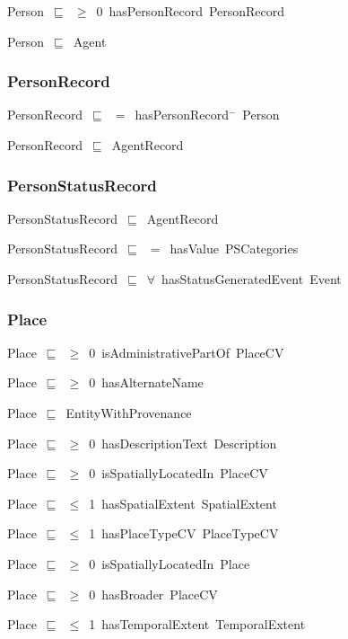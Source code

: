 \documentclass{article}
\begin{document}
Person~\ensuremath{\sqsubseteq}~\ensuremath{\geq}~0~hasPersonRecord~PersonRecord~

Person~\ensuremath{\sqsubseteq}~Agent~

\subsubsection*{PersonRecord}

PersonRecord~\ensuremath{\sqsubseteq}~\ensuremath{=}~hasPersonRecord\ensuremath{^-}~Person~

PersonRecord~\ensuremath{\sqsubseteq}~AgentRecord~

\subsubsection*{PersonStatusRecord}

PersonStatusRecord~\ensuremath{\sqsubseteq}~AgentRecord~

PersonStatusRecord~\ensuremath{\sqsubseteq}~\ensuremath{=}~hasValue~PSCategories~

PersonStatusRecord~\ensuremath{\sqsubseteq}~\ensuremath{\forall}~hasStatusGeneratedEvent~Event~

\subsubsection*{Place}

Place~\ensuremath{\sqsubseteq}~\ensuremath{\geq}~0~isAdministrativePartOf~PlaceCV~

Place~\ensuremath{\sqsubseteq}~\ensuremath{\geq}~0~hasAlternateName~

Place~\ensuremath{\sqsubseteq}~EntityWithProvenance~

Place~\ensuremath{\sqsubseteq}~\ensuremath{\geq}~0~hasDescriptionText~Description~

Place~\ensuremath{\sqsubseteq}~\ensuremath{\geq}~0~isSpatiallyLocatedIn~PlaceCV~

Place~\ensuremath{\sqsubseteq}~\ensuremath{\leq}~1~hasSpatialExtent~SpatialExtent~

Place~\ensuremath{\sqsubseteq}~\ensuremath{\leq}~1~hasPlaceTypeCV~PlaceTypeCV~

Place~\ensuremath{\sqsubseteq}~\ensuremath{\geq}~0~isSpatiallyLocatedIn~Place~

Place~\ensuremath{\sqsubseteq}~\ensuremath{\geq}~0~hasBroader~PlaceCV~

Place~\ensuremath{\sqsubseteq}~\ensuremath{\leq}~1~hasTemporalExtent~TemporalExtent~
\end{document}
